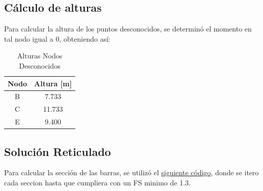 \subsection{Cálculo de alturas}

Para calcular la altura de los puntos desconocidos, se determinó el momento en tal nodo igual a 0, obteniendo así:

\begin{table}[H]
    \centering
    \begin{tabular}{|c|c|}
    \hline
    \textbf{Nodo} & \textbf{Altura [m]}  \\ 
    \hline
    B & 7.733  \\ 
    C & 11.733  \\ 
    E & 9.400 \\ 
    \hline
    \end{tabular}
    \caption{Alturas Nodos Desconocidos}
\end{table}

\newpage
\subsection{Solución Reticulado}

Para calcular la sección de las barras, se utilizó el \href{https://github.com/LukasWolff2002/PROYECTO_3_MCOC/blob/main/CODIGO/CODIGO_MANUAL/tipo_barras.py}{siguiente código}, donde se itero cada seccion hasta que cumpliera con un FS minimo de 1.3.

